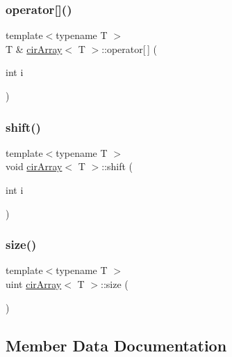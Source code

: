 \mbox{\label{classcirArray_a523faf5369bc1dd91750a9106ee2d553}} 
\subsubsection{\texorpdfstring{operator[]()}{operator[]()}}
{\footnotesize\ttfamily template$<$typename T $>$ \\
T \& \mbox{\hyperlink{classcirArray}{cir\+Array}}$<$ T $>$\+::operator\mbox{[}$\,$\mbox{]} (\begin{DoxyParamCaption}\item[{int}]{i }\end{DoxyParamCaption})}

\mbox{\label{classcirArray_a2d6c6f8c6692176f387c44dd53c67e8c}} 
\subsubsection{\texorpdfstring{shift()}{shift()}}
{\footnotesize\ttfamily template$<$typename T $>$ \\
void \mbox{\hyperlink{classcirArray}{cir\+Array}}$<$ T $>$\+::shift (\begin{DoxyParamCaption}\item[{int}]{i }\end{DoxyParamCaption})}

\mbox{\label{classcirArray_a45cd2458054ae24982c2cf816292c1e1}} 
\subsubsection{\texorpdfstring{size()}{size()}}
{\footnotesize\ttfamily template$<$typename T $>$ \\
uint \mbox{\hyperlink{classcirArray}{cir\+Array}}$<$ T $>$\+::size (\begin{DoxyParamCaption}{ }\end{DoxyParamCaption})}



\subsection{Member Data Documentation}
\mbox{\label{classcirArray_ac0064a9a3b5f975c5cfea0909e4d4907}} 

